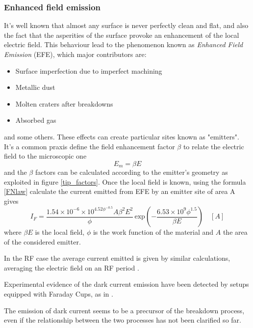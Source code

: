 \subsubsection{Enhanced field emission}

It's well known that almost any surface is never perfectly clean and flat, and also the fact that the asperities of the surface provoke an enhancement of the local electric field. This behaviour lead to the phenomenon known as \textit{Enhanced Field Emission} (EFE), which major contributors are:
\begin{itemize}
\item Surface imperfection due to imperfect machining
\item Metallic dust
\item Molten craters after breakdowns
\item Absorbed gas
\end{itemize} 
and some others. These effects can create particular sites known as "emitters". It's a common praxis define the field enhancement factor $\beta$ to relate the electric field to the microscopic one
\begin{equation}
E_{m} = \beta E
\end{equation}
and the $\beta$ factors can be calculated according to the emitter's geometry \cite{Rohrbach:190223} as exploited in figure \ref{tip_factors}.
Once the local field is known, using the formula \ref{FNlaw} calculate the current emitted from EFE by an emitter site of area A gives 
\begin{equation}
I_F = \frac{ 1.54\times10^{-6} \times 10^{4.52\phi^{-0.5}} A \beta^2 E^2}{  \phi } \, \text{exp} \left ( -\frac{6.53\times 10^9 \phi^{1.5}}{\beta E} \right ) \quad [A]  \label{If}
\end{equation}
where $\beta E$ is the local field, $\phi$ is the work function of the material and $A$ the area of the considered emitter.

 In the RF case the average current emitted is given by similar calculations, averaging the electric field on an RF period  \cite{Wang:1997ip}. 

Experimental evidence of the dark current emission have been detected by setups equipped with Faraday Cups, as in \cite{Wuensch:advaces}.

The emission of dark current seems to be a precursor of the breakdown  process, even if the relationship between the two processes has not been clarified so far.

